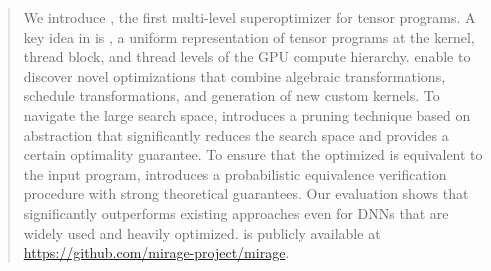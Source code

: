 \begin{abstract}
We introduce \sys, the first multi-level superoptimizer for tensor programs. 
A key idea in \sys is \graphs, a uniform representation of tensor programs at the kernel, thread block, and thread levels of the GPU compute hierarchy.
\graphs enable \sys to discover novel optimizations that combine algebraic transformations, schedule transformations, and generation of new custom kernels.
%
To navigate the large search space, \sys introduces a pruning technique based on abstraction that significantly reduces the search space and provides a certain optimality guarantee.
To ensure that the optimized \graph is equivalent to the input program, \sys introduces a probabilistic equivalence verification procedure with strong theoretical guarantees.
Our evaluation shows that \sys significantly outperforms existing approaches even for DNNs that are widely used and heavily optimized.
\iffinal
\sys is publicly available at \url{https://github.com/mirage-project/mirage}.
\fi 
\end{abstract}




